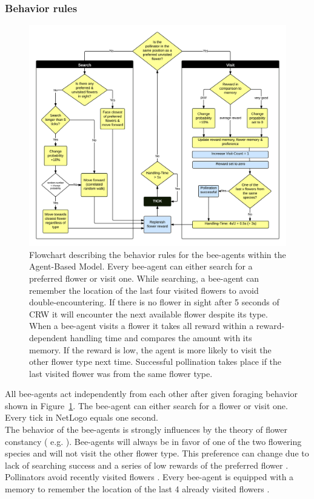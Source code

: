 \subsubsection{Behavior rules}

\begin{figure}
\centering
\includegraphics[width=15cm]{Images/flowchart-model}
 \caption{Flowchart describing the behavior rules for the bee-agents within the Agent-Based Model. Every bee-agent can either search for a preferred flower or visit one. While searching, a bee-agent can remember the location of the last four visited flowers to avoid double-encountering. If there is no flower in sight after 5 seconds of CRW it will encounter the next available flower despite its type. When a bee-agent visits a flower it takes all reward within a reward-dependent handling time and compares the amount with its memory. If the reward is low, the agent is more likely to visit the other flower type next time. Successful pollination takes place if the last visited flower was from the same flower type.}
 \label{fig:flowchart}
\end{figure}


All bee-agents act independently from each other after given foraging behavior shown in Figure~\ref{fig:flowchart}. The bee-agent can either search for a flower or visit one. Every tick in NetLogo equals one second. \\

The behavior of the bee-agents is strongly influences by the theory of flower constancy ( e.g.  \citealp{bobisud1975pollinator, chittka1997foraging, thomson1981field, chittka1999flower,  goulson1994model,  goulson1999foraging}). Bee-agents will always be in favor of one of the two flowering species and will not visit the other flower type. This preference can change due to lack of searching success and a series of low rewards of the preferred flower \citep{chittka1997foraging}. Pollinators avoid recently visited flowers \citep{goulson1999foraging}. Every bee-agent is equipped with a memory to remember the location of the last 4 already visited flowers \citep{goulson2000pollinators}.

